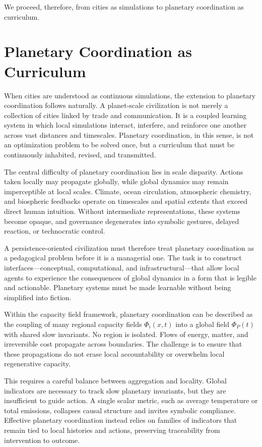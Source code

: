 \documentclass[12pt,oneside]{book}
\begin{document}
We proceed, therefore, from cities as simulations to planetary coordination as curriculum.

\chapter{Planetary Coordination as Curriculum}

When cities are understood as continuous simulations, the extension to planetary coordination follows naturally. A planet-scale civilization is not merely a collection of cities linked by trade and communication. It is a coupled learning system in which local simulations interact, interfere, and reinforce one another across vast distances and timescales. Planetary coordination, in this sense, is not an optimization problem to be solved once, but a curriculum that must be continuously inhabited, revised, and transmitted.

The central difficulty of planetary coordination lies in scale disparity. Actions taken locally may propagate globally, while global dynamics may remain imperceptible at local scales. Climate, ocean circulation, atmospheric chemistry, and biospheric feedbacks operate on timescales and spatial extents that exceed direct human intuition. Without intermediate representations, these systems become opaque, and governance degenerates into symbolic gestures, delayed reaction, or technocratic control.

A persistence-oriented civilization must therefore treat planetary coordination as a pedagogical problem before it is a managerial one. The task is to construct interfaces—conceptual, computational, and infrastructural—that allow local agents to experience the consequences of global dynamics in a form that is legible and actionable. Planetary systems must be made learnable without being simplified into fiction.

Within the capacity field framework, planetary coordination can be described as the coupling of many regional capacity fields \(\Phi_i(x,t)\) into a global field \(\Phi_P(t)\) with shared slow invariants. No region is isolated. Flows of energy, matter, and irreversible cost propagate across boundaries. The challenge is to ensure that these propagations do not erase local accountability or overwhelm local regenerative capacity.

This requires a careful balance between aggregation and locality. Global indicators are necessary to track slow planetary invariants, but they are insufficient to guide action. A single scalar metric, such as average temperature or total emissions, collapses causal structure and invites symbolic compliance. Effective planetary coordination instead relies on families of indicators that remain tied to local histories and actions, preserving traceability from intervention to outcome.
\end{document}
